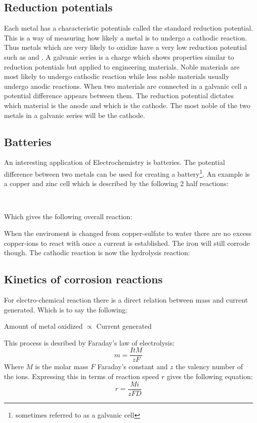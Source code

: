 \documentclass[11pt, a4paper]{article}
\begin{document}
\subsection{Reduction potentials}
Each metal has a characteristic potentials called the standard reduction potential. This is a way of measuring how likely a metal is to undergo a cathodic reaction. Thus metals which are very likely to oxidize have a very low reduction potential such as  and . A galvanic series is a charge which shows properties similar to reduction potentials but applied to engineering materials. Noble materials are most likely to undergo cathodic reaction while less noble materials usually undergo anodic reactions. When two materials are connected in a galvanic cell a potential difference appears between them. The reduction potential dictates which material is the anode and which is the cathode. The most noble of the two metals in a galvanic series will be the cathode.


\subsection{Batteries}
An interesting application of Electrochemistry is batteries. The potential difference between two metals can be used for creating a battery\footnote{sometimes referred to as a galvanic cell}. An example is a copper and zinc cell which is described by the following 2 half reactions:
\begin{center}
  \\
\end{center}
Which gives the following overall reaction:
\begin{center}
\end{center}
When the enviroment is changed from copper-sulfate to water there are no excess copper-ions to react with once a current is established. The iron will still corrode though. The cathodic reaction is now the hydrolysis reaction:
\begin{center}
\end{center}


\subsection{Kinetics of corrosion reactions}
For electro-chemical reaction there is a direct relation between mass and current generated. Which is to say the following:
\begin{center}
  Amount of metal oxidized $\propto$ Current generated
\end{center}
This process is desribed by Faraday's law of electrolysis:
\begin{equation}
  m = \frac{ItM}{zF}
\end{equation}
Where $M$ is the molar mass $F$ Faraday's constant and $z$ the valency number of the ions. Expressing this in terms of reaction speed $r$ gives the following equation:
\begin{equation}
  r =\frac{Mi}{zFD}
\end{equation}
\end{document}
